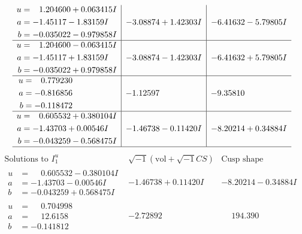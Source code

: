 \documentclass[1p]{elsarticle_modified}
\theoremstyle{definition}
\newcommand{\I}{\sqrt{-1}}
\begin{document}
$$\begin{array}{c|c|c}
\begin{aligned}
u &= \phantom{-}1.204600 + 0.063415 I \\
a &= -1.45117 - 1.83159 I \\
b &= -0.035022 - 0.979858 I\end{aligned}
 & -3.08874 + 1.42303 I & -6.41632 - 5.79805 I \\ \hline\begin{aligned}
u &= \phantom{-}1.204600 - 0.063415 I \\
a &= -1.45117 + 1.83159 I \\
b &= -0.035022 + 0.979858 I\end{aligned}
 & -3.08874 - 1.42303 I & -6.41632 + 5.79805 I \\ \hline\begin{aligned}
u &= \phantom{-}0.779230\phantom{ +0.000000I} \\
a &= -0.816856\phantom{ +0.000000I} \\
b &= -0.118472\phantom{ +0.000000I}\end{aligned}
 & -1.12597\phantom{ +0.000000I} & -9.35810\phantom{ +0.000000I} \\ \hline\begin{aligned}
u &= \phantom{-}0.605532 + 0.380104 I \\
a &= -1.43703 + 0.00546 I \\
b &= -0.043259 - 0.568475 I\end{aligned}
 & -1.46738 - 0.11420 I & -8.20214 + 0.34884 I\\
 \hline 
 \end{array}$$\newpage$$\begin{array}{c|c|c}  
\text{Solutions to }I^u_{1}& \I (\text{vol} + \sqrt{-1}CS) & \text{Cusp shape}\\
 \hline 
\begin{aligned}
u &= \phantom{-}0.605532 - 0.380104 I \\
a &= -1.43703 - 0.00546 I \\
b &= -0.043259 + 0.568475 I\end{aligned}
 & -1.46738 + 0.11420 I & -8.20214 - 0.34884 I \\ \hline\begin{aligned}
u &= \phantom{-}0.704998\phantom{ +0.000000I} \\
a &= \phantom{-}12.6158\phantom{ +0.000000I} \\
b &= -0.141812\phantom{ +0.000000I}\end{aligned}
 & -2.72892\phantom{ +0.000000I} & \phantom{-}194.390\phantom{ +0.000000I} \\ \hline\begin{aligned}

\end{aligned}
\end{array}$$
\end{document}
